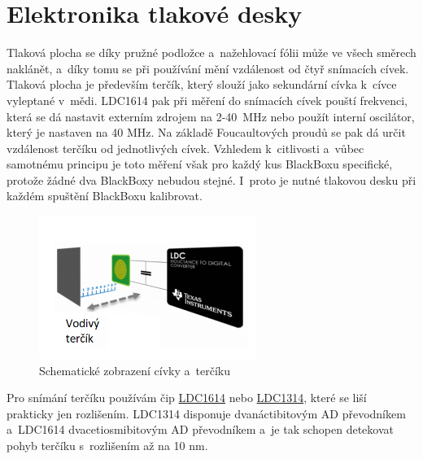 \section{Elektronika tlakové desky}
\label{E4-tlakovka}
Tlaková plocha se díky pružné podložce a~nažehlovací fólii může ve všech směrech naklánět, a~díky tomu se při používání mění vzdálenost od čtyř snímacích
cívek. Tlaková plocha je především terčík, který slouží jako se\-kun\-dár\-ní cívka k~cívce vyleptané v~mědi. LDC1614 pak při měření do snímacích 
cívek pouští frekvenci, která se dá nastavit externím zdrojem na 2-40~MHz nebo použít interní oscilátor, který je nastaven na 40 MHz. 
Na základě Foucaultových proudů se pak dá určit vzdálenost terčíku od jednotlivých cívek. 
Vzhledem k~citlivosti a~vůbec samotnému principu je toto měření však pro každý kus BlackBoxu specifické, 
protože žádné dva BlackBoxy nebudou stejné. 
I~proto je nutné tlakovou desku při každém spuštění BlackBoxu kalibrovat. 

\begin{figure}[h]
    \centering
    \includegraphics[width=200pt]{kapitoly/obrazky/E4/elektronika_tlakove_desky/civka_tercik_LDC.png}
    \caption{Schematické zobrazení cívky a~terčíku \parencite{LDC-cd1}}
    \label{fig:E4-sch_civka_tercik}
\end{figure}

\enlargethispage{5mm}
Pro snímání terčíku používám čip \href{https://www.ti.com/lit/ds/symlink/ldc1612.pdf?ts=1612018658531&ref_url=https%253A%252F%252Fwww.google.com%252F}{LDC1614} \parencite{LDC1614}
nebo \href{https://www.ti.com/lit/ds/symlink/ldc1312.pdf?ts=1612017390818&ref_url=https%253A%252F%252Fwww.google.com%252F}{LDC1314}, 
které se liší prakticky jen rozlišením. LDC1314 disponuje dvanáctibitovým AD převodníkem a~LDC1614 dvacetiosmibitovým AD převodníkem 
a~je tak schopen detekovat pohyb terčíku s~rozlišením až na 10 nm.

